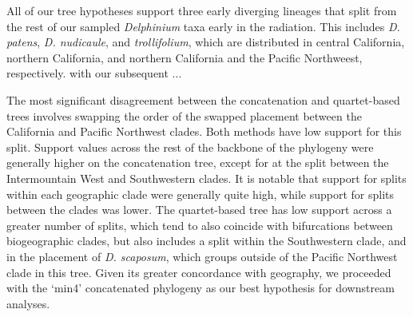 \documentclass[11pt]{article}
\begin{document}
All of our tree hypotheses support three early diverging lineages that split
from the rest of our sampled \emph{Delphinium} taxa early in the radiation. 
This includes \emph{D. patens}, \emph{D. nudicaule}, and \emph{trollifolium},
which are distributed in central California, northern California, and northern 
California and the Pacific Northweest, respectively. 
with our subsequent ...


The most significant disagreement between the concatenation and quartet-based 
trees involves swapping the order of the  swapped placement between the California
and Pacific Northwest clades. Both methods have low support for this split. 
Support values across the rest of the backbone of the phylogeny were 
generally higher on the concatenation tree, except for at the split between the
Intermountain West and Southwestern clades. It is notable that support for splits
within each geographic clade were generally quite high, while support for splits 
between the clades was lower.  The quartet-based tree has low support across a greater
number of splits, which tend to also coincide with bifurcations between biogeographic
clades, but also includes a split within the Southwestern clade, and in the placement
of \emph{D. scaposum}, which groups outside of the Pacific Northwest clade in this
tree. Given its greater concordance with geography, we proceeded with the ‘min4’
concatenated phylogeny as our best hypothesis for downstream analyses.

\end{document}
